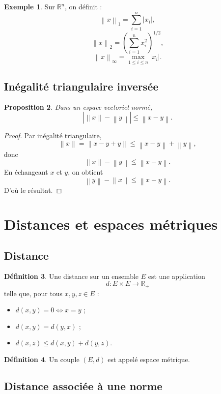 \documentclass[11pt,a4paper]{article}
\theoremstyle{definition}
\newtheorem{definition}{Définition}[section]
\newtheorem{exemple}[definition]{Exemple}
\theoremstyle{plain}
\newtheorem{proposition}[definition]{Proposition}
\newcommand{\R}{\mathbb{R}}
\newcommand{\norme}[1]{\left\lVert #1 \right\rVert}
\begin{document}
\begin{exemple}
Sur $\R^n$, on définit :
\[
\norme{x}_1=\sum_{i=1}^n |x_i|,
\]
\[
\norme{x}_2=\left(\sum_{i=1}^n x_i^2\right)^{1/2},
\]
\[
\norme{x}_\infty=\max_{1\leq i\leq n}|x_i|.
\]
\end{exemple}

\subsection{Inégalité triangulaire inversée}

\begin{proposition}
Dans un espace vectoriel normé,
\[
\left|\norme{x}-\norme{y}\right|
\leq
\norme{x-y}.
\]
\end{proposition}

\begin{proof}
Par inégalité triangulaire,
\[
\norme{x}=\norme{x-y+y}\leq \norme{x-y}+\norme{y},
\]
donc
\[
\norme{x}-\norme{y}\leq \norme{x-y}.
\]
En échangeant $x$ et $y$, on obtient
\[
\norme{y}-\norme{x}\leq \norme{x-y}.
\]
D'où le résultat.
\end{proof}

\section{Distances et espaces métriques}

\subsection{Distance}

\begin{definition}
Une distance sur un ensemble $E$ est une application
\[
d:E\times E\to\R_+
\]
telle que, pour tous $x,y,z\in E$ :
\begin{itemize}
    \item $d(x,y)=0\Longleftrightarrow x=y$ ;
    \item $d(x,y)=d(y,x)$ ;
    \item $d(x,z)\leq d(x,y)+d(y,z)$.
\end{itemize}
\end{definition}

\begin{definition}
Un couple $(E,d)$ est appelé espace métrique.
\end{definition}

\subsection{Distance associée à une norme}
\end{document}
